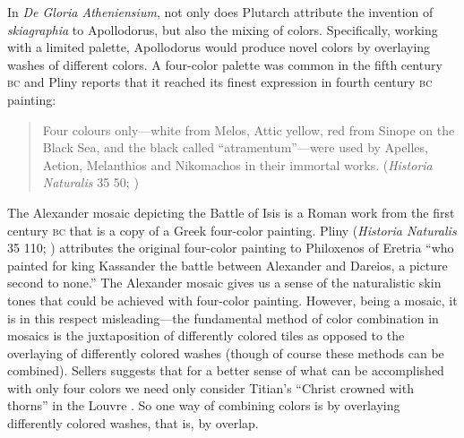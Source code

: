 In \emph{De Gloria Atheniensium}, not only does Plutarch attribute the invention of \emph{skiagraphia} to Apollodorus, but also the mixing of colors. Specifically, working with a limited palette, Apollodorus would produce novel colors by overlaying washes of different colors. A four-color palette was common in the fifth century \textsc{bc} and  Pliny reports that it reached its finest expression in fourth century \textsc{bc} painting:
\begin{quote}
	Four colours only---white from Melos, Attic yellow, red from Sinope on the Black Sea, and the black called ``atramentum''---were used by Apelles, Aetion, Melanthios and Nikomachos in their immortal works. (\emph{Historia Naturalis} 35 50; \citealt[97]{Jex-Blake:1896uq})
\end{quote}
The Alexander mosaic depicting the Battle of Isis is a Roman work from the first century \textsc{bc} that is a copy of a Greek four-color painting. Pliny (\emph{Historia Naturalis} 35 110; \citealt[143]{Jex-Blake:1896uq}) attributes the original four-color painting to Philoxenos of Eretria ``who painted for king Kassander the battle between Alexander and Dareios, a picture second to none.'' The Alexander mosaic gives us a sense of the naturalistic skin tones that could be achieved with four-color painting. However, being a mosaic, it is in this respect misleading---the fundamental method of color combination in mosaics is the juxtaposition of differently colored tiles as opposed to the overlaying of differently colored washes (though of course these methods can be combined). Sellers suggests that for a better sense of what can be accomplished with only four colors we need only consider Titian's ``Christ crowned with thorns'' in the Louvre \citep[97 note]{Jex-Blake:1896uq}. So one way of combining colors is by overlaying differently colored washes, that is, by overlap.

